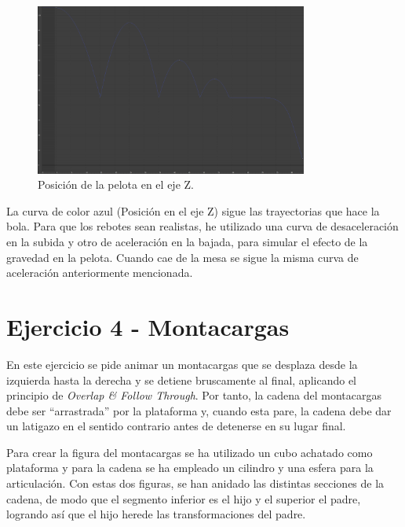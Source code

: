 \documentclass{article}
\begin{document}
\begin{figure}[H]
    \centering
    \includegraphics[width=0.8\textwidth]{imagenes/Ejercicio3/corregidas/curvas/blue.png}
    \caption{Posición de la pelota en el eje Z.}
\end{figure}

La curva de color azul (Posición en el eje Z) sigue las trayectorias que hace la bola. Para que los rebotes sean realistas, he utilizado una curva de desaceleración en la subida y otro de aceleración en la bajada, para simular el efecto de la gravedad en la pelota. Cuando cae de la mesa se sigue la misma curva de aceleración anteriormente mencionada.

\newpage

\section{Ejercicio 4 - Montacargas}

En este ejercicio se pide animar un montacargas que se desplaza desde la izquierda hasta la derecha y se detiene bruscamente al final, aplicando el principio de \textit{Overlap \& Follow Through}. Por tanto, la cadena del montacargas debe ser ``arrastrada'' por la plataforma y, cuando esta pare, la cadena debe dar un latigazo en el sentido contrario antes de detenerse en su lugar final.

\bigskip

Para crear la figura del montacargas se ha utilizado un cubo achatado como plataforma y para la cadena se ha empleado un cilindro y una esfera para la articulación. Con estas dos figuras, se han anidado las distintas secciones de la cadena, de modo que el segmento inferior es el hijo y el superior el padre, logrando así que el hijo herede las transformaciones del padre.
\end{document}
